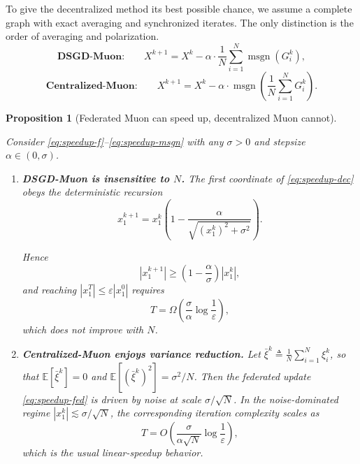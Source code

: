 \documentclass{article}
\newtheorem{proposition}{Proposition}
\newcommand{\E}{\mathbb{E}}
\begin{document}
To give the decentralized method its best possible chance, we assume a complete
graph with exact averaging and synchronized iterates. The only distinction is
the order of averaging and polarization.
\begin{equation}
\label{eq:speedup-dec}
\textbf{DSGD-Muon:}\qquad
X^{k+1}=X^k-\alpha\cdot\frac{1}{N}\sum_{i=1}^N \operatorname{msgn}(G_i^k),
\end{equation}
\begin{equation}
\label{eq:speedup-fed}
\textbf{Centralized-Muon:}\qquad
X^{k+1}=X^k-\alpha\cdot\operatorname{msgn}\!\left(\frac{1}{N}\sum_{i=1}^N G_i^k\right).
\end{equation}

\begin{proposition}[Federated Muon can speed up, decentralized Muon cannot]
\label{prop:speedup-counterexample}

Consider \eqref{eq:speedup-f}--\eqref{eq:speedup-msgn} with any $\sigma>0$ and
stepsize $\alpha\in(0,\sigma)$.

\begin{enumerate}
\item 
\textbf{DSGD-Muon is insensitive to $N$.}
The first coordinate of \eqref{eq:speedup-dec} obeys the deterministic
recursion
\begin{equation}
\label{eq:speedup-recursion}
x_1^{k+1}
= x_1^k\left(1-\frac{\alpha}{\sqrt{(x_1^k)^2+\sigma^2}}\right).
\end{equation}

Hence
\[
|x_1^{k+1}| \ge \left(1-\frac{\alpha}{\sigma}\right)|x_1^k|,
\]
and reaching $|x_1^T|\le \varepsilon |x_1^0|$ requires
\[
T=\Omega\!\left(\frac{\sigma}{\alpha}\log\frac{1}{\varepsilon}\right),
\]
which does not improve with $N$.

\item 
\textbf{Centralized-Muon enjoys variance reduction.}
Let $\bar \xi^k\triangleq \frac{1}{N}\sum_{i=1}^N \xi_i^k$, so that
$\E[\bar \xi^k]=0$ and $\E[(\bar \xi^k)^2]=\sigma^2/N$.
Then the federated update \eqref{eq:speedup-fed} is driven by noise at scale
$\sigma/\sqrt{N}$.
In the noise-dominated regime $|x_1^k|\lesssim \sigma/\sqrt{N}$, the
corresponding iteration complexity scales as
\[
T=O\!\left(\frac{\sigma}{\alpha\sqrt{N}}\log\frac{1}{\varepsilon}\right),
\]
which is the usual linear-speedup behavior.

\end{enumerate}
\end{proposition}
\end{document}
